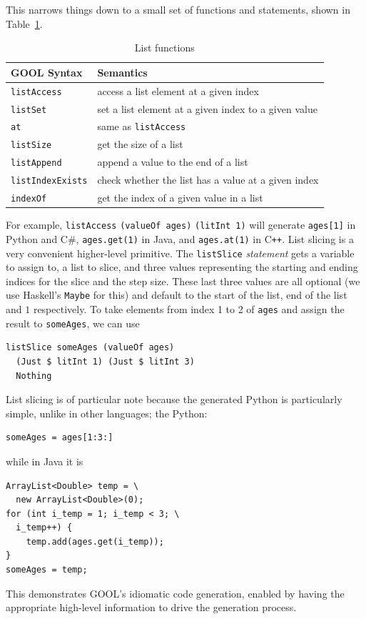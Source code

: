 \documentclass[sigplan,review,anonymous,prologue,dvipsnames]{acmart}
\newcommand{\Csharp}{C\#}
\newcommand{\Cplusplus}{C\texttt{++}}
\begin{document}
This narrows things down to a small set of functions and statements, shown in 
Table~\ref{tab:listfuncs}.
\begin{table}[bth]
\caption{List functions}
\begin{tabular}{p{} p{}}
  \textbf{GOOL Syntax} & \textbf{Semantics} \\
  \midrule
  \verb|listAccess| & access a list element at a given index \\
  \verb|listSet| & set a list element at a given index to a given value \\
  \verb|at| & same as \verb|listAccess| \\
  \verb|listSize| & get the size of a list \\
  \verb|listAppend| & append a value to the end of a list \\
  \verb|listIndexExists| & check whether the list has a value at a given index 
  \\
  \verb|indexOf| & get the index of a given value in a list \\
\end{tabular}
\label{tab:listfuncs}
\end{table}
For example, \verb|listAccess| \verb|(valueOf ages)| \verb|(litInt 1)| will 
generate
\verb|ages[1]| in Python and \Csharp, \verb|ages.get(1)| in Java, and
\verb|ages.at(1)| in \Cplusplus.  List slicing is a very convenient
higher-level primitive.  The \verb|listSlice| \emph{statement} gets
a variable to assign to, a list to slice, and three
values representing the starting and ending indices for the slice and the step
size. These last three values are all optional (we use Haskell's \verb|Maybe|
for this) and default to the start of the list, end of the list and $1$
respectively.  To take elements from index 1 to 2 of \verb|ages| and
assign the result to \verb|someAges|, we can use
\begin{lstlisting}
listSlice someAges (valueOf ages)
  (Just $ litInt 1) (Just $ litInt 3)
  Nothing
\end{lstlisting}
List slicing is of particular note because the generated Python is particularly
simple, unlike in other languages; the Python:
\begin{lstlisting}
someAges = ages[1:3:]
\end{lstlisting}
while in Java it is
\begin{lstlisting}
ArrayList<Double> temp = \
  new ArrayList<Double>(0);
for (int i_temp = 1; i_temp < 3; \
  i_temp++) {
    temp.add(ages.get(i_temp));
}
someAges = temp;
\end{lstlisting}
This demonstrates GOOL's idiomatic code generation, enabled by having the
appropriate high-level information to drive the generation process.
\end{document}
